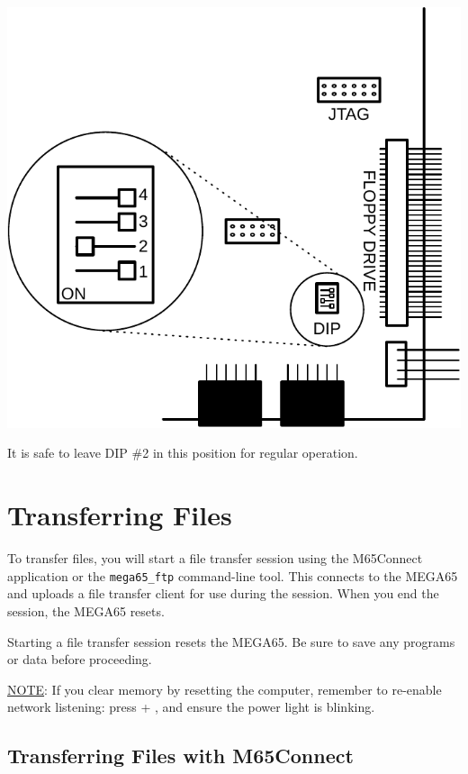 \begin{center}
\includegraphics[width=\linewidth]{images/illustrations/mega65-dip2.pdf}
\end{center}

It is safe to leave DIP \#2 in this position for regular operation.


\section{Transferring Files}

To transfer files, you will start a file transfer session using the M65Connect application or the {\tt mega65\_ftp} command-line tool. This connects to the MEGA65 and uploads a file transfer client for use during the session. When you end the session, the MEGA65 resets.

Starting a file transfer session resets the MEGA65. Be sure to save any programs or data before proceeding.

\underline{NOTE}: If you clear memory by resetting the computer, remember to re-enable network listening: press  + \megakey{\pounds}, and ensure the power light is blinking.

\subsection{Transferring Files with M65Connect}

